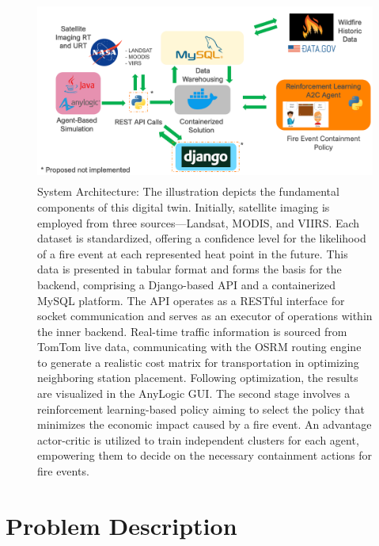 \documentclass[lettersize,journal]{IEEEtran}
\begin{document}
\begin{figure}
  \centering
  \includegraphics[height=6cm,width=12cm]{Arch.png}
  \caption{
    System Architecture: The illustration depicts the fundamental components of this digital twin. Initially, satellite imaging is employed from three sources—Landsat, MODIS, and VIIRS. Each dataset is standardized, offering a confidence level for the likelihood of a fire event at each represented heat point in the future. This data is presented in tabular format and forms the basis for the backend, comprising a Django-based API and a containerized MySQL platform. The API operates as a RESTful interface for socket communication and serves as an executor of operations within the inner backend. Real-time traffic information is sourced from TomTom live data, communicating with the OSRM routing engine to generate a realistic cost matrix for transportation in optimizing neighboring station placement. Following optimization, the results are visualized in the AnyLogic GUI. The second stage involves a reinforcement learning-based policy aiming to select the policy that minimizes the economic impact caused by a fire event. An advantage actor-critic is utilized to train independent clusters for each agent, empowering them to decide on the necessary containment actions for fire events. }\label{fig:arch}
  
\end{figure}

\section{Problem Description}\label{Problem Description}

\end{document}

